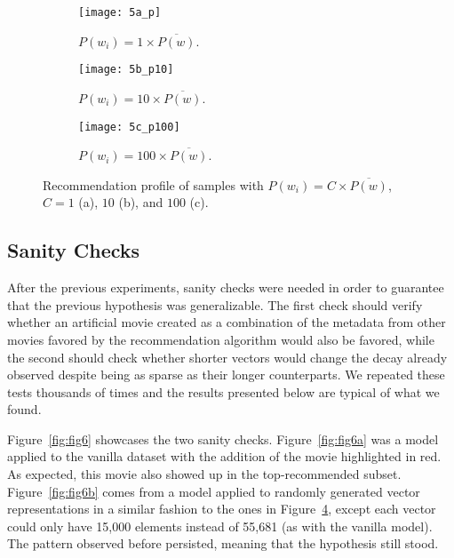\begin{figure}
  \centering
  \begin{subfigure}{0.3\textwidth}
    \centering
    \texttt{[image: 5a\_p]}
    \caption{$P(w_{i}) = 1 \times \overline{P(w)}$.\label{fig:fig5a}}
  \end{subfigure}
  \begin{subfigure}{0.3\textwidth}
    \centering
    \texttt{[image: 5b\_p10]}
    \caption{$P(w_{i}) = 10 \times \overline{P(w)}$.\label{fig:fig5b}}
  \end{subfigure}
  \begin{subfigure}{0.3\textwidth}
    \centering
    \texttt{[image: 5c\_p100]}
    \caption{$P(w_{i}) = 100 \times \overline{P(w)}$.\label{fig:fig5c}}
  \end{subfigure}
  \caption{Recommendation profile of samples with
    $P(w_{i}) = C \times \overline{P(w)}$, $C = 1$ (a), $10$ (b), and $100$
    (c).\label{fig:fig5}}
\end{figure}

\subsection{Sanity Checks}
\label{subsec:sanity03}

After the previous experiments, sanity checks were needed in order to guarantee
that the previous hypothesis was generalizable. The first check should verify
whether an artificial movie created as a combination of the metadata from other
movies favored by the recommendation algorithm would also be favored, while the
second should check whether shorter vectors would change the decay already
observed despite being as sparse as their longer counterparts. We repeated these
tests thousands of times and the results presented below are typical of what we
found.

Figure~\ref{fig:fig6} showcases the two sanity checks. Figure~\ref{fig:fig6a}
was a model applied to the vanilla dataset with the addition of the movie
highlighted in red. As expected, this movie also showed up in the
top-recommended subset. Figure~\ref{fig:fig6b} comes from a model applied to
randomly generated vector representations in a similar fashion to the ones in
Figure~\ref{fig:fig5}, except each vector could only have 15,000 elements
instead of 55,681 (as with the vanilla model). The pattern observed before
persisted, meaning that the hypothesis still stood.

